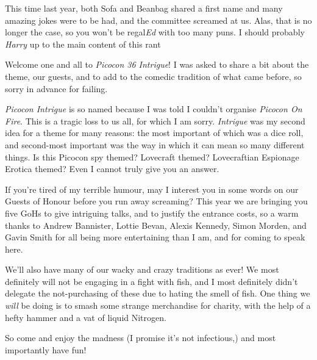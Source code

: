 This time last year, both Sofa and Beanbag shared a first name and
many amazing jokes were to be had, and the committee screamed at
us. Alas, that is no longer the case, so you won’t be regal\emph{Ed}
with too many puns. I should probably \emph{Harry} up to the main
content of this rant \textemdash{}

Welcome one and all to \emph{Picocon 36 Intrigue}! I was asked to
share a bit about the theme, our guests, and to add to the comedic
tradition of what came before, so sorry in advance for failing.

\emph{Picocon Intrigue} is so named because I was told I couldn’t
organise \emph{Picocon On Fire}. This is a tragic loss to us all, for
which I am sorry. \emph{Intrigue} was my second idea for a theme for
many reasons: the most important of which was a dice roll, and
second-most important was the way in which it can mean so many
different things. Is this Picocon spy themed? Lovecraft themed?
Lovecraftian Espionage Erotica themed? Even I cannot truly give you an
answer.

If you’re tired of my terrible humour, may I interest you in some
words on our Guests of Honour before you run away screaming? This year
we are bringing you five GoHs to give intriguing talks, and to justify
the entrance costs, so a warm thanks to Andrew Bannister, Lottie
Bevan, Alexis Kennedy, Simon Morden, and Gavin Smith for all being
more entertaining than I am, and for coming to speak here.

We’ll also have many of our wacky and crazy traditions as ever! We
most definitely will not be engaging in a fight with fish, and I most
definitely didn’t delegate the not-purchasing of these due to hating
the smell of fish. One thing we \emph{will} be doing is to smash some
strange merchandise for charity, with the help of a hefty hammer and a
vat of liquid Nitrogen.

So come and enjoy the madness (I promise it’s not infectious,) and
most importantly \textemdash{} have fun!
